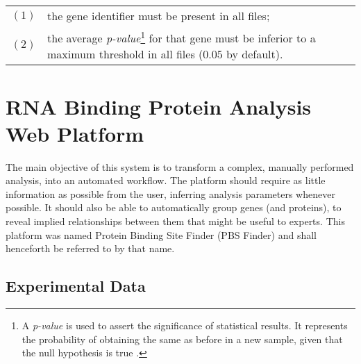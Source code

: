 \begin{savenotes}
\begin{table}[H]
  \begin{tabular}{l p{}}
    $(1)$ & the gene identifier must be present in all files;\\
    $(2)$ & the average \emph{p-value}\footnote{A \emph{p-value} is used to
    assert the significance of statistical results. It represents the
    probability of obtaining the same as before in a new sample, given that the
    null hypothesis is true \cite{goodman45dirty}.} for that gene must be
    inferior to a maximum threshold in all files ($0.05$ by default).\\
  \end{tabular}
\end{table}
\end{savenotes}

\section{RNA Binding Protein Analysis Web Platform}


The main objective of this system is to transform a complex, manually performed
analysis, into an automated workflow. The platform should require as little
information as possible from the user, inferring analysis parameters whenever
possible. It should also be able to automatically group genes (and proteins), to
reveal implied relationships between them that might be useful to experts. This
platform was named Protein Binding Site Finder (PBS Finder) and shall henceforth
be referred to by that name.

\subsection{Experimental Data}

